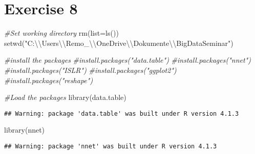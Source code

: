 \documentclass[
]{article}
\author{}
\date{\vspace{-2.5em}}
\newenvironment{Shaded}{\begin{snugshade}}{\end{snugshade}}
\newcommand{\AttributeTok}[1]{\textcolor[rgb]{0.77,0.63,0.00}{#1}}
\newcommand{\CommentTok}[1]{\textcolor[rgb]{0.56,0.35,0.01}{\textit{#1}}}
\newcommand{\FunctionTok}[1]{\textcolor[rgb]{0.00,0.00,0.00}{#1}}
\newcommand{\NormalTok}[1]{#1}
\newcommand{\SpecialCharTok}[1]{\textcolor[rgb]{0.00,0.00,0.00}{#1}}
\newcommand{\StringTok}[1]{\textcolor[rgb]{0.31,0.60,0.02}{#1}}
\begin{document}
\hypertarget{exercise-8}{%
\section{Exercise 8}\label{exercise-8}}

\begin{Shaded}
\begin{Highlighting}[]
\CommentTok{\#Set working directory}
\FunctionTok{rm}\NormalTok{(}\AttributeTok{list=}\FunctionTok{ls}\NormalTok{())}
\FunctionTok{setwd}\NormalTok{(}\StringTok{"C:}\SpecialCharTok{\textbackslash{}\textbackslash{}}\StringTok{Users}\SpecialCharTok{\textbackslash{}\textbackslash{}}\StringTok{Remo\_}\SpecialCharTok{\textbackslash{}\textbackslash{}}\StringTok{OneDrive}\SpecialCharTok{\textbackslash{}\textbackslash{}}\StringTok{Dokumente}\SpecialCharTok{\textbackslash{}\textbackslash{}}\StringTok{BigDataSeminar"}\NormalTok{)}
\end{Highlighting}
\end{Shaded}

\begin{Shaded}
\begin{Highlighting}[]
\CommentTok{\#install the packages}
\CommentTok{\#install.packages("data.table")}
\CommentTok{\#install.packages("nnet")}
\CommentTok{\#install.packages("ISLR")}
\CommentTok{\#install.packages("ggplot2")}
\CommentTok{\#install.packages("reshape")}
\end{Highlighting}
\end{Shaded}

\begin{Shaded}
\begin{Highlighting}[]
\CommentTok{\#Load the packages}
\FunctionTok{library}\NormalTok{(data.table)}
\end{Highlighting}
\end{Shaded}

\begin{verbatim}
## Warning: package 'data.table' was built under R version 4.1.3
\end{verbatim}

\begin{Shaded}
\begin{Highlighting}[]
\FunctionTok{library}\NormalTok{(nnet)}
\end{Highlighting}
\end{Shaded}

\begin{verbatim}
## Warning: package 'nnet' was built under R version 4.1.3
\end{verbatim}
\end{document}

